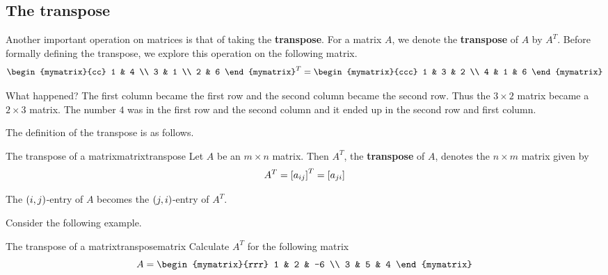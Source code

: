\subsection{The transpose}

Another important operation on matrices is that of taking the \textbf{transpose}. For a matrix $A$, we denote the
\textbf{transpose} of $A$ by $A^T$. Before formally defining the transpose, we explore this
operation on the following matrix.
\begin{equation*}
\begin{mymatrix}{cc}
1 & 4 \\
3 & 1 \\
2 & 6
\end{mymatrix} ^{T}=\allowbreak \begin{mymatrix}{ccc}
1 & 3 & 2 \\
4 & 1 & 6
\end{mymatrix}
\end{equation*}

What happened? The first column became the first row and the second column
became the second row. Thus the $3\times 2$ matrix became a $2\times 3$
matrix. The number $4$ was in the first row and the second column and it
ended up in the second row and first column. 

The definition of the transpose is as follows.

\begin{definition}{The transpose of a matrix}{matrixtranspose}
Let $A$ be an $m\times n$ matrix. Then $A^{T}$, the \textbf{transpose} of $A$,  denotes the $n\times m$
matrix given by 
\begin{equation*}
A^{T} = \left[a _{ij}\right] ^{T}= \left[a_{ji} \right]
\end{equation*}
\end{definition}

The $\left(i, j  \right)$-entry of $A$ becomes the 
$\left(j,i \right)$-entry of $A^T$. 

Consider the following example.

\begin{example}{The transpose of a matrix}{transposematrix}
Calculate $A^T$ for the following matrix
\begin{equation*}
A = \begin{mymatrix}{rrr}
1 & 2 & -6 \\
3 & 5 & 4
\end{mymatrix}
\end{equation*}
\end{example}

